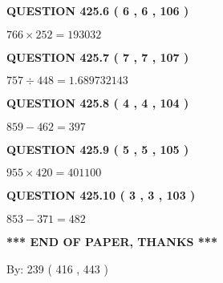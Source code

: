 \documentclass{ctexart}
\begin{document}
\vspace{0.2in}
  
{\textbf{\Large{QUESTION
425.6 
 ( 6 , 6 , 106 )
}}}
  
  
 
 

$ %
766 \times  %
252=   %
193032$
 
 
  
\vspace{0.2in}
  
{\textbf{\Large{QUESTION
425.7 
 ( 7 , 7 , 107 )
}}}
  
  
 
 

$ %
757 \div  %
448=   %
1.689732143$
 
 
  
\vspace{0.2in}
  
{\textbf{\Large{QUESTION
425.8 
 ( 4 , 4 , 104 )
}}}
  
  
 
 

$ %
859 -  %
462=   %
397$
 
 
  
\vspace{0.2in}
  
{\textbf{\Large{QUESTION
425.9 
 ( 5 , 5 , 105 )
}}}
  
  
 
 

$ %
955 \times  %
420=   %
401100$
 
 
  
\vspace{0.2in}
  
{\textbf{\Large{QUESTION
425.10 
 ( 3 , 3 , 103 )
}}}
  
  
 
 

$ %
853 -  %
371=   %
482$
 
 
   
   
 \vspace{0.2in}
 
   
   
   
   
\vspace{1.0in} 
{\textbf{\large{ *** END OF PAPER, THANKS *** }}} 
   
   
\hspace{1.0in} By: 
 239 ( 416 ,  443 )
   
   
   
   
\newpage 
\setcounter{page}{ 
   426001 } 
   
\end{document}
